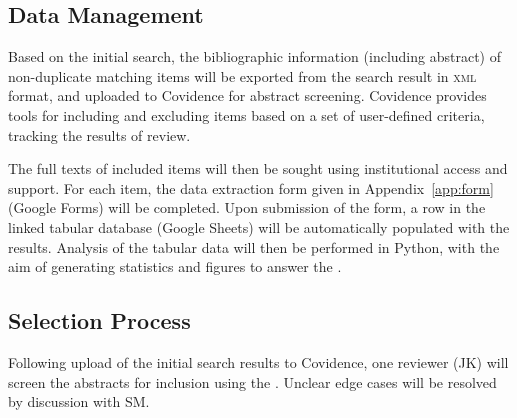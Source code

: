 \documentclass{article}
\begin{document}
\subsection{Data Management}
Based on the initial search,
the bibliographic information (including abstract)
of non-duplicate matching items will be
exported from the search result in \textsc{xml} format,
and uploaded to Covidence for abstract screening.
Covidence provides tools for including and excluding items
based on a set of user-defined criteria,
tracking the results of review.
\par
The full texts of included items will then be sought
using institutional access and support.
For each item, the data extraction form given in Appendix~\ref{app:form}
(Google Forms) will be completed.
Upon submission of the form, a row in the linked tabular database
(Google Sheets) will be automatically populated with the results.
Analysis of the tabular data will then be performed in Python,
with the aim of generating statistics and figures to answer
the .
\subsection{Selection Process}
Following upload of the initial search results to Covidence,
one reviewer (JK) will screen the abstracts for inclusion
using the .
Unclear edge cases will be resolved by discussion with SM.
\end{document}
